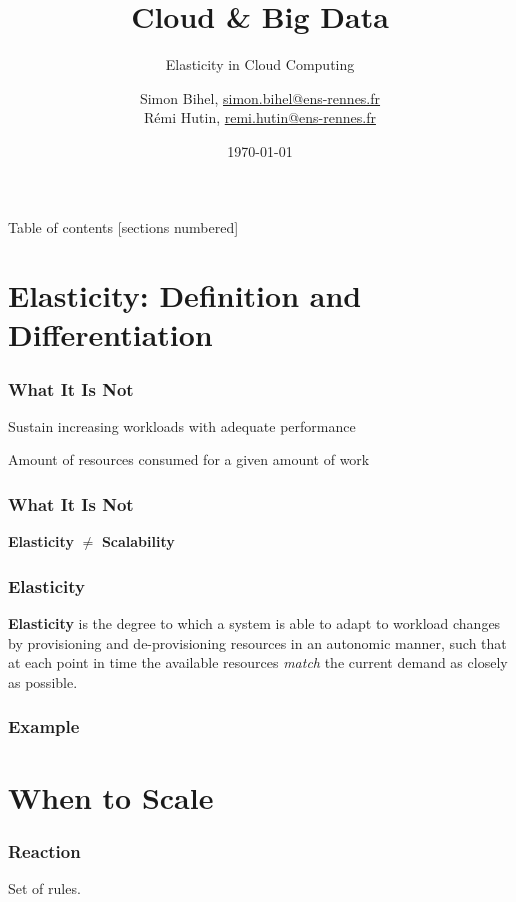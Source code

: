\documentclass{beamer}
\title{Cloud \& Big Data}
\subtitle{Elasticity in Cloud Computing}
\date{\today}
\author{%
  Simon Bihel, \url{simon.bihel@ens-rennes.fr} \\
  Rémi Hutin, \url{remi.hutin@ens-rennes.fr}
}
\institute{%
  University of Rennes I \\
  École normale supérieure de Rennes
}
\begin{document}
\maketitle

\begin{frame}{Table of contents}
  [sections numbered]
  \tableofcontents[hideallsubsections]
\end{frame}


\section{Elasticity: Definition and Differentiation}
\begin{frame}
  \frametitle{What It Is Not~\cite{herbst2013elasticity}}
  \begin{description}
    \parbox{\linewidth}{
    \item[Scalability] Sustain increasing workloads with adequate performance
    \item[Efficiency] Amount of resources consumed for a given amount of work
    }
  \end{description}
\end{frame}


\begin{frame}
  \frametitle{What It Is Not~\cite{herbst2013elasticity}}
  \centering
  \Large\textbf{Elasticity} $\neq$ \textbf{Scalability}
\end{frame}

\begin{frame}
  \frametitle{Elasticity~\cite{herbst2013elasticity}~\cite{galante2012survey}~\cite{gulati2011cloud}~\cite{sharma2011cost}~\cite{moore2013coordinated}}
  \begin{definition}
  \parbox{\linewidth}{\textbf{Elasticity} is the degree to which a system is able to adapt to
    workload changes by provisioning and de-provisioning resources in an
    autonomic manner, such that at each point in time the available resources
    \textit{match} the current demand as closely as possible.
  }
  \end{definition}
\end{frame}

\begin{frame}
  \frametitle{Example}
\end{frame}


\section{When to Scale}
\begin{frame}
  \frametitle{Reaction}
  Set of rules.
\end{frame}
\end{document}
